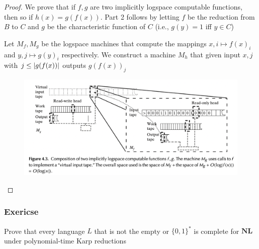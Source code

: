 \documentclass[11pt]{article}
\def \NL {\textbf{NL}}
\begin{document}
\begin{proof}
We prove that if \(f,g\) are two implicitly logspace computable functions, then so
if \(h(x)=g(f(x))\). Part 2 follows by letting \(f\) be the reduction from \(B\) to \(C\)
and \(g\) be the characteristic function of \(C\) (i.e., \(g(y)=1\) iff \(y\in C\))

Let \(M_f,M_g\) be the logspace machines that compute the mappings \(x,i\mapsto f(x)_i\)
and \(y,j\mapsto g(y)_i\) respectively. We construct a machine \(M_h\) that given input \(x,j\)
with \(j\le\abs{g(f(x))}\) outputs \(g(f(x))_j\)

\begin{figure}[htbp]
\centering
\includegraphics[width=.9\textwidth]{../images/ComputationalComplexity/10.png}
\label{}
\end{figure}
\end{proof}

\subsubsection{Exericse}
\label{sec:org66149ef}
\begin{exercise}
\label{ex4.3}
Prove that every language \(L\) that is not the empty or \(\{0,1\}^*\) is complete for \(\NL\)
under polynomial-time Karp reductions
\end{exercise}

\begin{exercise}
\label{ex4.8}
\end{exercise}
\end{document}
